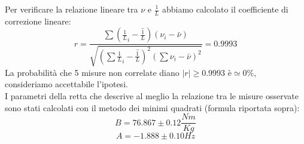 \documentclass[a4paper]{article}
\theoremstyle{definition}
\begin{document}
\begin{figure}[!ht]
\end{figure}

Per verificare la relazione lineare tra \(\nu\) e \(\frac{1}{L}\) abbiamo calcolato il coefficiente di correzione lineare:
\[ r = \frac{\sum (\frac{1}{L}_{i}-\bar{\frac{1}{L}})(\nu_{i}-\bar{\nu})}{\sqrt{(\sum \frac{1}{L}_{i}-\bar{\frac{1}{L}})^{2}(\sum \nu_{i}-\bar{\nu})^{2}}} =  0.9993\]
\noindent La probabilità che 5 misure non correlate diano \(\left | r \right | \geq  0.9993\) è\(\simeq 0 \%\), consideriamo accettabile l'ipotesi.\\
I parametri della retta che descrive al meglio la relazione tra le misure osservate sono stati calcolati con il metodo dei minimi quadrati (formula riportata sopra):
\[B=76.867\pm 0.12 \frac{Nm}{Kg}\]
\[A=-1.888\pm 0.10Hz\]
\end{document}
